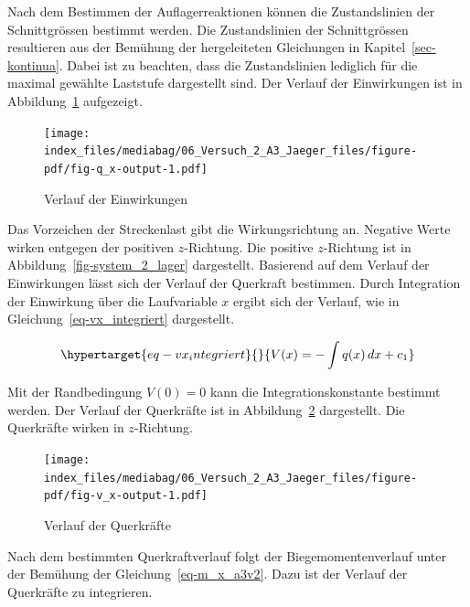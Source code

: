 \documentclass[
  12pt,
  letterpaper,
  egregdoesnotlikesansseriftitles]{scrreprt}
\begin{document}
Nach dem Bestimmen der Auflagerreaktionen können die Zustandslinien der
Schnittgrössen bestimmt werden. Die Zustandslinien der Schnittgrössen
resultieren aus der Bemühung der hergeleiteten Gleichungen in
Kapitel~\ref{sec-kontinua}. Dabei ist zu beachten, dass die
Zustandslinien lediglich für die maximal gewählte Laststufe dargestellt
sind. Der Verlauf der Einwirkungen ist in Abbildung~\ref{fig-q_x}
aufgezeigt.

\begin{figure}[H]

{\centering \texttt{[image: index\_files/mediabag/06\_Versuch\_2\_A3\_Jaeger\_files/figure-pdf/fig-q\_x-output-1.pdf]}

}

\caption{\label{fig-q_x}Verlauf der Einwirkungen}

\end{figure}

Das Vorzeichen der Streckenlast gibt die Wirkungsrichtung an. Negative
Werte wirken entgegen der positiven \(z\)-Richtung. Die positive
\(z\)-Richtung ist in Abbildung~\ref{fig-system_2_lager} dargestellt.
Basierend auf dem Verlauf der Einwirkungen lässt sich der Verlauf der
Querkraft bestimmen. Durch Integration der Einwirkung über die
Laufvariable \(x\) ergibt sich der Verlauf, wie in
Gleichung~\ref{eq-vx_integriert} dargestellt.

\begin{equation}\protect\hypertarget{eq-vx_integriert}{}{
V(x) = -\int q(x) \, dx + c_1
}\label{eq-vx_integriert}\end{equation}

Mit der Randbedingung \(V(0) = 0\) kann die Integrationskonstante
bestimmt werden. Der Verlauf der Querkräfte ist in
Abbildung~\ref{fig-v_x} dargestellt. Die Querkräfte wirken in
\(z\)-Richtung.

\begin{figure}[H]

{\centering \texttt{[image: index\_files/mediabag/06\_Versuch\_2\_A3\_Jaeger\_files/figure-pdf/fig-v\_x-output-1.pdf]}

}

\caption{\label{fig-v_x}Verlauf der Querkräfte}

\end{figure}

Nach dem bestimmten Querkraftverlauf folgt der Biegemomentenverlauf
unter der Bemühung der Gleichung~\ref{eq-m_x_a3v2}. Dazu ist der Verlauf
der Querkräfte zu integrieren.
\end{document}

